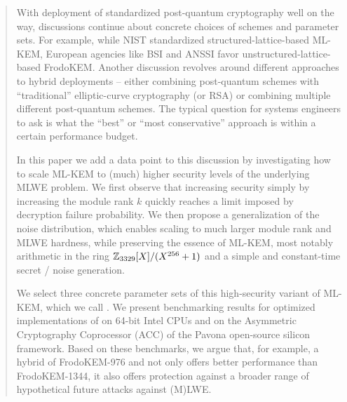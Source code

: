 \begin{abstract}
  With deployment of standardized post-quantum cryptography
  well on the way, discussions continue about concrete choices
  of schemes and parameter sets. For example, while NIST standardized
  structured-lattice-based ML-KEM, European agencies like BSI and
  ANSSI favor unstructured-lattice-based FrodoKEM. Another discussion
  revolves around different approaches to hybrid deployments -- 
  either combining post-quantum schemes 
  with ``traditional'' elliptic-curve cryptography (or RSA) or 
  combining multiple different post-quantum schemes.
  The typical question for systems engineers to ask is what the ``best''
  or ``most conservative'' approach is within a certain performance budget.  

  In this paper we add a data point to this discussion by investigating
  how to scale ML-KEM to (much) higher security levels of the underlying
  MLWE problem. We first observe that increasing security 
  simply by increasing the module rank $k$ 
  quickly reaches a limit imposed by decryption failure probability.
  We then propose a generalization of the noise distribution, which enables scaling
  to much larger module rank and MLWE hardness, while preserving the essence
  of ML-KEM, most notably arithmetic in the ring $\Z_{3329}[X]/(X^{256}+1)$ 
  and a simple and constant-time secret / noise generation.

  We select three concrete parameter sets of this high-security variant
  of ML-KEM, which we call \kaiburr. We present benchmarking results
  for optimized implementations of \kaiburr on 64-bit Intel CPUs and on
  the Asymmetric Cryptography Coprocessor (ACC) of the Pavona open-source silicon framework.
  Based on these benchmarks, we argue that, for example, 
  a hybrid of FrodoKEM-976 and  not only offers better
  performance than FrodoKEM-1344, it also offers protection against
  a broader range of hypothetical future attacks against (M)LWE.
\end{abstract}
